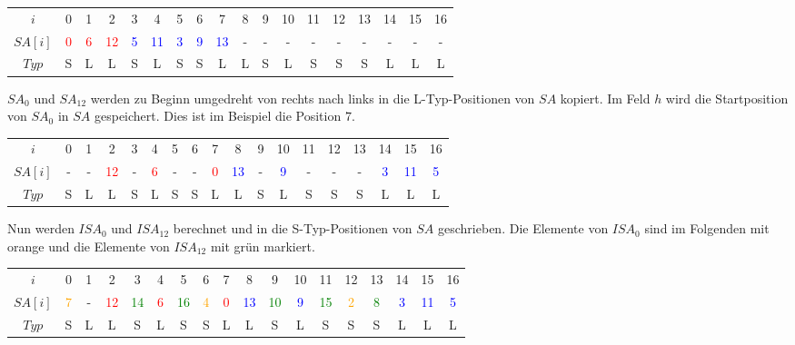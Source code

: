 \begin{table}[H]
	\footnotesize
	\centering
	\begin{tabular}{c| c c c c c c c c c c c c c c c c c}
		$i$ & 0 & 1 & 2 & 3 & 4 & 5 & 6 & 7 & 8 & 9 & 10 & 11 & 12 & 13 & 14 & 15 & 16 \\
		$SA[i]$ & \textcolor{red}{0} & \textcolor{red}{6} & \textcolor{red}{12} & \textcolor{blue}{5} & \textcolor{blue}{11} & \textcolor{blue}{3} & \textcolor{blue}{9} & \textcolor{blue}{13} & - & - & - & - & - & - & - & - & - \\
		$Typ$ & S & L & L & S & L & S & S & L & L & S & L & S & S & S & L & L & L
	\end{tabular}
\end{table}

$SA_0$ und $SA_{12}$ werden zu Beginn umgedreht von rechts nach links in die L-Typ-Positionen von $SA$ kopiert. Im Feld $h$ wird die Startposition von $SA_0$ in $SA$ gespeichert. Dies ist im Beispiel die Position $7$.

\begin{table}[H]
	\footnotesize
	\centering
	\begin{tabular}{c| c c c c c c c c c c c c c c c c c}
		$i$ & 0 & 1 & 2 & 3 & 4 & 5 & 6 & 7 & 8 & 9 & 10 & 11 & 12 & 13 & 14 & 15 & 16 \\
		$SA[i]$ & - & - & \textcolor{red}{12} & - & \textcolor{red}{6} & - & - & \textcolor{red}{0} & \textcolor{blue}{13} & - & \textcolor{blue}{9} & - & - & - & \textcolor{blue}{3} & \textcolor{blue}{11} & \textcolor{blue}{5} \\
		$Typ$ & S & L & L & S & L & S & S & L & L & S & L & S & S & S & L & L & L
	\end{tabular}
\end{table}

Nun werden $ISA_0$ und $ISA_{12}$ berechnet und in die S-Typ-Positionen von $SA$ geschrieben. Die Elemente von $ISA_0$ sind im Folgenden mit orange und die Elemente von $ISA_{12}$ mit grün markiert.

\begin{table}[H]
	\footnotesize
	\centering
	\begin{tabular}{c| c c c c c c c c c c c c c c c c c}
		$i$ & 0 & 1 & 2 & 3 & 4 & 5 & 6 & 7 & 8 & 9 & 10 & 11 & 12 & 13 & 14 & 15 & 16 \\
		$SA[i]$ & \textcolor{orange}{7} & - & \textcolor{red}{12} & \textcolor{green}{14} & \textcolor{red}{6} & \textcolor{green}{16} & \textcolor{orange}{4} & \textcolor{red}{0} & \textcolor{blue}{13} & \textcolor{green}{10} & \textcolor{blue}{9} & \textcolor{green}{15} & \textcolor{orange}{2} & \textcolor{green}{8} & \textcolor{blue}{3} & \textcolor{blue}{11} & \textcolor{blue}{5} \\
		$Typ$ & S & L & L & S & L & S & S & L & L & S & L & S & S & S & L & L & L
	\end{tabular}
\end{table}


